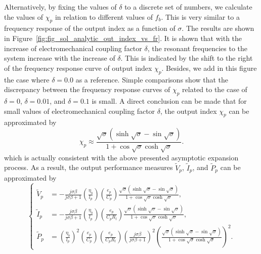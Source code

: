 \documentclass{svjour3}                     %
\begin{document}
Alternatively, by fixing the values of $\delta$ to a discrete set of numbers, we calculate the values of $\chi_p$ in relation to different values of $f_b$. This is very similar to a frequency response of the output index as a function of $\sigma$. The results are shown in Figure~\ref{fig:fig_sol_analytic_out_index_vs_fr}. It is shown that with the increase of electromechanical coupling factor $\delta$, the resonant frequencies to the system increase with the increase of $\delta$. This is indicated by the shift to the right of the frequency response curve of output index $\chi_p$. Besides, we add in this figure the case where $\delta = 0.0$ as a reference. Simple comparisons show that the discrepancy between the frequency response curves of $\chi_p$ related to the case of $\delta = 0$, $\delta=0.01$, and $\delta = 0.1$ is small. A direct conclusion can be made that for small values of electromechanical coupling factor $\delta$, the output index $\chi_p$ can be approximated by 
\begin{equation}
    \chi_p \approx \frac{ \sqrt{\sigma} \left( \sinh\sqrt{\sigma} - \sin\sqrt{\sigma} \right) }{ 1 + \cos\sqrt{\sigma } \cosh\sqrt{\sigma } }.
\end{equation}
which is actually consistent with the above presented asymptotic expansion process. As a result, the output performance measures $\tilde{V}_p$, $\tilde{I}_p$, and $\tilde{P}_p$ can be approximated by 
\begin{equation}
    \left\{\begin{aligned}
        \tilde{V}_p &= - \frac{j \sigma \beta}{j \sigma \beta + 1} \left(\frac{\eta_b}{l_p}\right) \left(\frac{e_p}{C_p}\right) \frac{ \sqrt{\sigma} \left( \sinh\sqrt{\sigma} - \sin\sqrt{\sigma} \right) }{ 1 + \cos\sqrt{\sigma } \cosh\sqrt{\sigma } } , \\
        \tilde{I}_p &= - \frac{ j \sigma \beta } {j \sigma \beta + 1} \left( \frac{\eta_b}{l_p} \right) \left( \frac{e_p}{C_p R_l} \right) \frac{ \sqrt{\sigma} \left( \sinh\sqrt{\sigma} - \sin\sqrt{\sigma} \right) }{ 1 + \cos\sqrt{\sigma } \cosh\sqrt{\sigma } }, \\
        \tilde{P}_p &= \left(\frac{\eta_b}{l_p}\right)^2 \left(\frac{e_p}{C_p}\right) \left( \frac{e_p}{C_p R_l} \right) \left( \frac{ j \sigma \beta}{ j \sigma \beta + 1 } \right)^2 \left( \frac{ \sqrt{\sigma} \left( \sinh\sqrt{\sigma} - \sin\sqrt{\sigma} \right) }{ 1 + \cos\sqrt{\sigma } \cosh\sqrt{\sigma } } \right)^2.
    \end{aligned}\right.
    \label{eq:eq_peh_perfs_compact_form_approx}
\end{equation}
\end{document}
